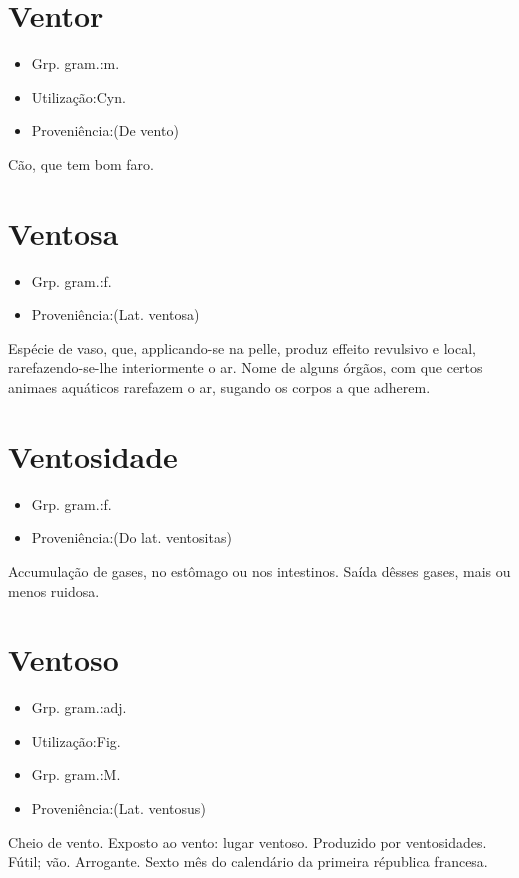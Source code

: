 \documentclass{article}
\begin{document}
\section{Ventor}
\begin{itemize}
\item {Grp. gram.:m.}
\end{itemize}
\begin{itemize}
\item {Utilização:Cyn.}
\end{itemize}
\begin{itemize}
\item {Proveniência:(De \textunderscore vento\textunderscore )}
\end{itemize}
Cão, que tem bom faro.
\section{Ventosa}
\begin{itemize}
\item {Grp. gram.:f.}
\end{itemize}
\begin{itemize}
\item {Proveniência:(Lat. \textunderscore ventosa\textunderscore )}
\end{itemize}
Espécie de vaso, que, applicando-se na pelle, produz effeito revulsivo e local, rarefazendo-se-lhe interiormente o ar.
Nome de alguns órgãos, com que certos animaes aquáticos rarefazem o ar, sugando os corpos a que adherem.
\section{Ventosidade}
\begin{itemize}
\item {Grp. gram.:f.}
\end{itemize}
\begin{itemize}
\item {Proveniência:(Do lat. \textunderscore ventositas\textunderscore )}
\end{itemize}
Accumulação de gases, no estômago ou nos intestinos.
Saída dêsses gases, mais ou menos ruidosa.
\section{Ventoso}
\begin{itemize}
\item {Grp. gram.:adj.}
\end{itemize}
\begin{itemize}
\item {Utilização:Fig.}
\end{itemize}
\begin{itemize}
\item {Grp. gram.:M.}
\end{itemize}
\begin{itemize}
\item {Proveniência:(Lat. \textunderscore ventosus\textunderscore )}
\end{itemize}
Cheio de vento.
Exposto ao vento: \textunderscore lugar ventoso\textunderscore .
Produzido por ventosidades.
Fútil; vão.
Arrogante.
Sexto mês do calendário da primeira républica francesa.
\end{document}
